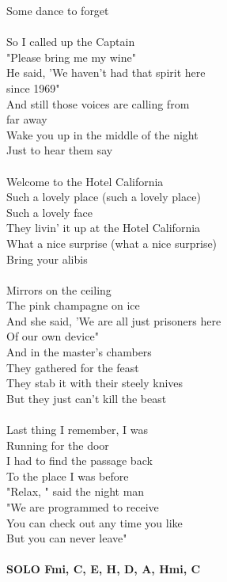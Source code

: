 \begin{multicols}{2}
Some dance to forget\\
\\
So I called up the Captain\\
"Please bring me my wine"\\
He said, 'We haven't had that spirit here\\
since 1969"\\
And still those voices are calling from\\
far away\\
Wake you up in the middle of the night\\
Just to hear them say\\
\\
Welcome to the Hotel California\\
Such a lovely place (such a lovely place)\\
Such a lovely face\\
They livin' it up at the Hotel California\\
What a nice surprise (what a nice surprise)\\
Bring your alibis\\
\\
Mirrors on the ceiling\\
The pink champagne on ice\\
And she said, 'We are all just prisoners here\\
Of our own device"\\
And in the master's chambers\\
They gathered for the feast\\
They stab it with their steely knives\\
But they just can't kill the beast\\
\\
Last thing I remember, I was\\
Running for the door\\
I had to find the passage back\\
To the place I was before\\
"Relax, " said the night man\\
"We are programmed to receive\\
You can check out any time you like\\
But you can never leave"\\
\\
\footnotesize\textbf{SOLO F\kr mi, C\kr \7, E, H, D, A, Hmi, C\kr \7}
\normalsize
\end{multicols}